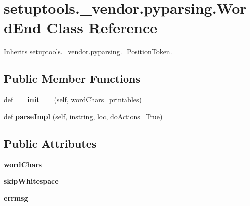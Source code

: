 \hypertarget{classsetuptools_1_1__vendor_1_1pyparsing_1_1_word_end}{}\section{setuptools.\+\_\+vendor.\+pyparsing.\+Word\+End Class Reference}
\label{classsetuptools_1_1__vendor_1_1pyparsing_1_1_word_end}


Inherits \hyperlink{classsetuptools_1_1__vendor_1_1pyparsing_1_1___position_token}{setuptools.\+\_\+vendor.\+pyparsing.\+\_\+\+Position\+Token}.

\subsection*{Public Member Functions}
\begin{DoxyCompactItemize}
\item 
\mbox{\label{classsetuptools_1_1__vendor_1_1pyparsing_1_1_word_end_a16cf414fea8691c74fd805e487967613}} 
def {\bfseries \+\_\+\+\_\+init\+\_\+\+\_\+} (self, word\+Chars=printables)
\item 
\mbox{\label{classsetuptools_1_1__vendor_1_1pyparsing_1_1_word_end_ae7b93cbcaa7bdb0ec270bc9763a82d25}} 
def {\bfseries parse\+Impl} (self, instring, loc, do\+Actions=True)
\end{DoxyCompactItemize}
\subsection*{Public Attributes}
\begin{DoxyCompactItemize}
\item 
\mbox{\label{classsetuptools_1_1__vendor_1_1pyparsing_1_1_word_end_a9a7a435976cb1e5ebc244c13680a1683}} 
{\bfseries word\+Chars}
\item 
\mbox{\label{classsetuptools_1_1__vendor_1_1pyparsing_1_1_word_end_aa9367120e34c7fe6f9583c30cb22d695}} 
{\bfseries skip\+Whitespace}
\item 
\mbox{\label{classsetuptools_1_1__vendor_1_1pyparsing_1_1_word_end_a755a7e6b8a3dc65b67a58c867fa77d4e}} 
{\bfseries errmsg}
\end{DoxyCompactItemize}
